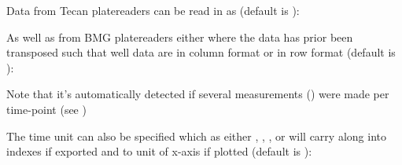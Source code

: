 \documentclass[letterpaper,10pt,english]{sphinxmanual}
\begin{document}
Data from Tecan platereaders can be read in as (default is ):

%
\begin{sphinxVerbatim}[commandchars=\\\{\}]
   
\end{sphinxVerbatim}


As well as from BMG platereaders either where the data has prior
been transposed  such that well data are in column format
or in row format  (default is ):

%
\begin{sphinxVerbatim}[commandchars=\\\{\}]
   
\end{sphinxVerbatim}

Note that it’s automatically detected if several measurements
() were made per time-point (see {\hyperref[\detokenize{cookbook:accessing-data}]{}})

The time unit can also be specified which as either ,
, , or  will carry along into indexes
if exported and to unit of x-axis if plotted (default is ):

%
\begin{sphinxVerbatim}[commandchars=\\\{\}]
  
\end{sphinxVerbatim}
\end{document}
